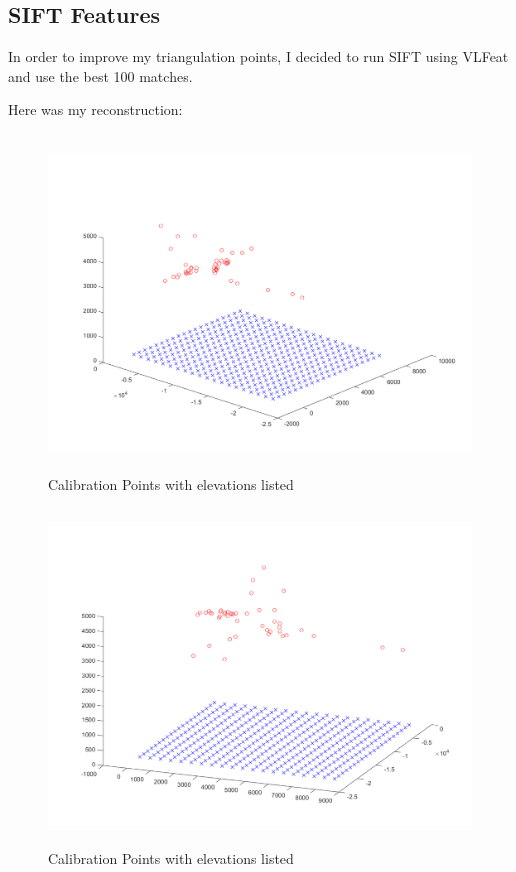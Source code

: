 \documentclass[11pt,psfig]{article}
\begin{document}
\subsection{SIFT Features}

In order to improve my triangulation points, I decided to run SIFT using VLFeat and use the best 100 matches. 


Here was my reconstruction:
\begin{figure}[H]
\centering
\includegraphics[height=3.5in]{sfmResults1/triangulationAttemptSIFT1.png}
\caption{Calibration Points with elevations listed}
\end{figure}
\begin{figure}[H]
\centering
\includegraphics[height=3.5in]{sfmResults1/triangulationAttemptSIFT2.png}
\caption{Calibration Points with elevations listed}
\end{figure}
\end{document}
